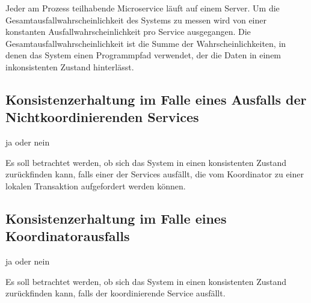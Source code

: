 Jeder am Prozess teilhabende Microservice läuft auf einem Server. Um die Gesamtausfallwahrscheinlichkeit des Systems zu messen wird von einer konstanten Ausfallwahrscheinlichkeit pro Service ausgegangen. Die Gesamtausfallwahrscheinlichkeit ist die Summe der Wahrscheinlichkeiten, in denen das System einen Programmpfad verwendet, der die Daten in einem inkonsistenten Zustand hinterlässt.

\subsection{Konsistenzerhaltung im Falle eines Ausfalls der Nichtkoordinierenden Services}
ja oder nein

Es soll betrachtet werden, ob sich das System in einen konsistenten Zustand zurückfinden kann, falls einer der Services ausfällt, die vom Koordinator zu einer lokalen Transaktion aufgefordert werden können. 


\subsection{Konsistenzerhaltung im Falle eines Koordinatorausfalls}
ja oder nein 

Es soll betrachtet werden, ob sich das System in einen konsistenten Zustand zurückfinden kann, falls der koordinierende Service ausfällt. 